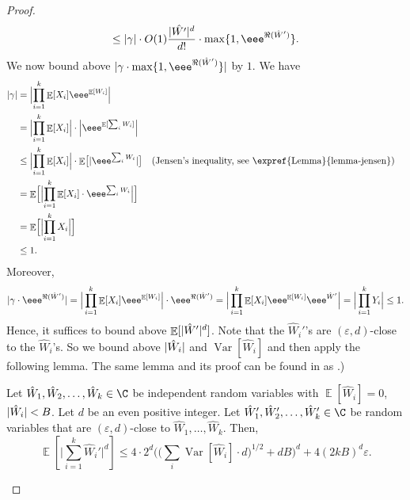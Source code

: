 \documentclass{toc}
\def\eps{\varepsilon}
\DeclarePairedDelimiter{\abs}{\lvert}{\rvert}
\DeclareMathOperator*{\E}{\mathbb{E}}                 %
\DeclareMathOperator*{\Var}{Var}                 %
\begin{document}
\begin{proof}
\[      \le \abs{\gamma} \cdot O(1) \frac{ \abs{\hat {W'}}^d }{ d! } \cdot \max\{ 1, \eee^{\Re(\hat W')} \} .
    \]
    We now bound above $\abs{\gamma \cdot \max\{1, \eee^{\Re(\hat W')}\}}$ by $1$.
    We have
    \begin{align*}
      \abs{\gamma}
      &= \Bigl| \prod_{i = 1}^k \E[X_i] \eee^{\E[W_i]} \Bigr| \\
      &= \Bigl| \prod_{i = 1}^k \E[X_i] \Bigr| \cdot \Bigl| \eee^{\E[\sum_i W_i]} \Bigr| \\
      &\le \Bigl| \prod_{i = 1}^k \E[X_i] \Bigr| \cdot \E\bigl[ \abs{ \eee^{ \sum_i W_i} } \bigr] && \text{(Jensen's inequality, see \expref{Lemma}{lemma-jensen})} \\
      &= \E \Bigl[ \Bigl| \prod_{i = 1}^k \E[X_i] \cdot \eee^{ \sum_i W_i} \Bigr| \Bigr] \\
      &= \E \Bigl[ \Bigl| \prod_{i = 1}^k X_i \Bigr| \Bigr] \\
      &\le 1 .
    \end{align*}
    Moreover,
    \begin{align*}
      \abs{\gamma \cdot \eee^{\Re(\hat W')}}
      = \Big| \prod_{i = 1}^k \E[X_i] \eee^{\E[W_i]} \Big| \cdot \eee^{\Re(\hat W')}
      = \Big| \prod_{i = 1}^k \E[X_i] \eee^{\E[W_i]} \eee^{\hat W'} \Big|
      = \Big| \prod_{i = 1}^k Y_i \Big|
      \le 1 .
    \end{align*}
    Hence, it suffices to bound above $\E[\abs{\hat W'}^d]$.
    Note that the $\hat W_i'$'s are $(\eps, d)$-close to the $\hat W_i$'s.
    So we bound above $\abs{\hat W_i}$ and $\Var[\hat W_i]$ and then apply the following lemma. 
    The same lemma and its proof can be found in  as .)

    \begin{lemma} \label{lemma-moments-bound-almost-independent}
      Let $\hat W_1, \hat W_2, \ldots, \hat W_k \in \C$ be independent random variables with $\E[\hat W_i] = 0$, $\abs{\hat W_i} < B$.
      Let $d$ be an even positive integer.
      Let $\hat W_1', \hat W_2', \ldots, \hat W_k' \in \C$ be random variables that are $(\eps, d)$-close to $\hat W_1, \ldots, \hat W_k$.
      Then,
      \[
        \E \left[ \Big| \sum_{i = 1}^k \hat W_i' \Big|^d \right]
        \le 4 \cdot 2^d \Big( \Big( \sum_i \Var[\hat W_i] \cdot d \Big)^{1/2} + d B \Big)^d + 4 (2kB)^d \eps.
      \]
    \end{lemma}


\end{proof}
\end{document}
